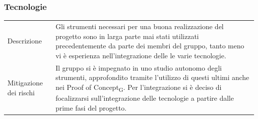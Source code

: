 \documentclass{article}
\begin{document}
\subsubsection{Tecnologie}\begin{center}
\begin{tabular}{P{10em} P{20em}} 
     Descrizione & Gli strumenti necessari per una buona realizzazione del progetto sono in larga parte mai stati utilizzati precedentemente da parte dei membri del gruppo, tanto meno vi è esperienza nell'integrazione delle le varie tecnologie.\\ 
    Mitigazione dei rischi & Il gruppo si è impegnato in uno studio autonomo degli strumenti, approfondito tramite l'utilizzo di questi ultimi anche nei Proof of Concept\textsubscript{G}. Per l'integrazione si è deciso di focalizzarsi sull'integrazione delle tecnologie a partire dalle prime fasi del progetto.\\
\end{tabular}
\label{tab:mittecnologie}
\end{center}
\end{document}

